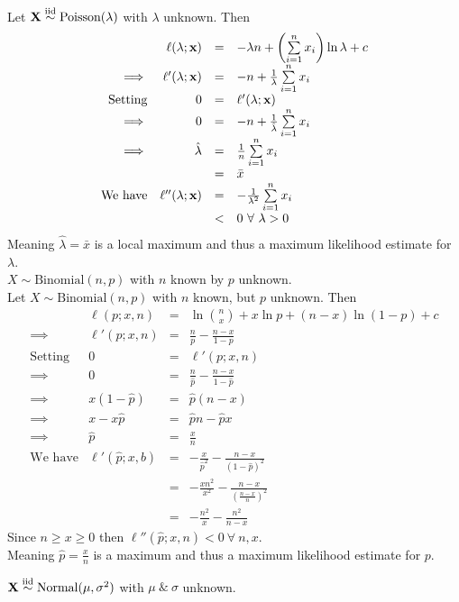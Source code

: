 \documentclass[11pt,a4paper]{article}
\begin{document}
\apart
Let $\textbf{X}\overset{\text{iid}}{\sim}\text{Poisson}(\lambda)$ with $\lambda$ unknown. Then
\[\begin{array}{rrcl}
&\ell(\lambda;\textbf{x})&=&-\lambda n+\left(\sum\limits_{i=1}^nx_i\right)\ln\lambda+c\\
\implies&\ell'(\lambda;\textbf{x})&=&-n+\frac{1}{\lambda}\sum\limits_{i=1}^nx_i\\
\text{Setting}&0&=&\ell'(\lambda;\textbf{x})\\
\implies&0&=&-n+\frac{1}{\hat{\lambda}}\sum\limits_{i=1}^nx_i\\
\implies&\hat{\lambda}&=&\frac{1}{n}\sum\limits_{i=1}^nx_i\\
&&=&\bar{x}\\
\text{We have}&\ell''(\lambda;\textbf{x})&=&-\frac{1}{\lambda^2}\sum\limits_{i=1}^nx_i\\
&&<&0\ \forall\ \lambda>0
\end{array}\]
Meaning $\hat{\lambda}=\bar{x}$ is a local maximum and thus a maximum likelihood estimate for $\lambda$.\\

\qpartnb $X\sim\mathrm{Binomial}(n,p)$ with $n$ known by $p$ unknown.\\

\apart
Let $X\sim\text{Binomial}(n,p)$ with $n$ known, but $p$ unknown. Then
\[\begin{array}{rrcl}
&\ell(p;x,n)&=&\ln{n\choose x}+x\ln p+(n-x)\ln(1-p)+c\\
\implies&\ell'(p;x,n)&=&\frac{n}{p}-\frac{n-x}{1-p}\\
\mathrm{Setting}&0&=&\ell'(p;x,n)\\
\implies&0&=&\frac{n}{\hat{p}}-\frac{n-x}{1-\hat{p}}\\
\implies&x(1-\hat{p})&=&\hat{p}(n-x)\\
\implies&x-x\hat{p}&=&\hat{p}n-\hat{p}x\\
\implies&\hat{p}&=&\frac{x}{n}\\
\text{We have}&\ell'(\hat{p};x,b)&=&-\frac{x}{\hat{p}^2}-\frac{n-x}{(1-\hat{p})^2}\\
&&=&-\frac{xn^2}{x^2}-\frac{n-x}{\left(\frac{n-x}{n}\right)^2}\\
&&=&-\frac{n^2}{x}-\frac{n^2}{n-x}
\end{array}\]
Since $n\geq x\geq0$ then $\ell''(\hat{p};x,n)<0\ \forall\ n,x$.\\
Meaning $\hat{p}=\frac{x}{n}$ is a maximum and thus a maximum likelihood estimate for $p$.

\qpartnb $\textbf{X}\overset{\mathrm{iid}}{\sim}\mathrm{Normal}(\mu,\sigma^2)$ with $\mu\ \&\ \sigma$ unknown.\\
\end{document}
